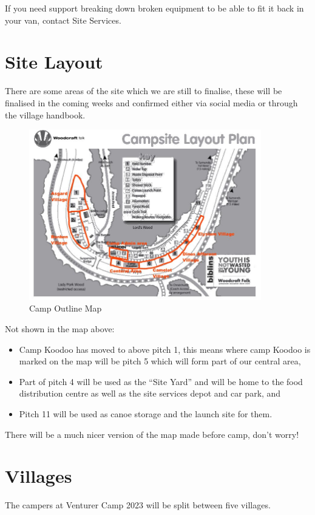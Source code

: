 \documentclass[a4paper, 11pt]{report}
\begin{document}
If you need support breaking down broken equipment to be able to fit it back in your van, contact Site Services.

\chapter{Site Layout}
There are some areas of the site which we are still to finalise, these will be finalised in the coming weeks and confirmed either via social media or through the village handbook. 
\begin{figure}[H]
    \centering
    \includegraphics[width=0.9\textwidth]{camp-map-v1.jpg}
    \caption{Camp Outline Map}
\end{figure}
Not shown in the map above:
\begin{itemize}
    \item Camp Koodoo has moved to above pitch 1, this means where camp Koodoo is marked on the map will be pitch 5 which will form part of our central area,
    \item Part of pitch 4 will be used as the ``Site Yard'' and will be home to the food distribution centre as well as the site services depot and car park, and
    \item Pitch 11 will be used as canoe storage and the launch site for them. 
\end{itemize}

There will be a much nicer version of the map made before camp, don't worry!

\chapter{Villages}
The campers at Venturer Camp 2023 will be split between five villages.
\end{document}
